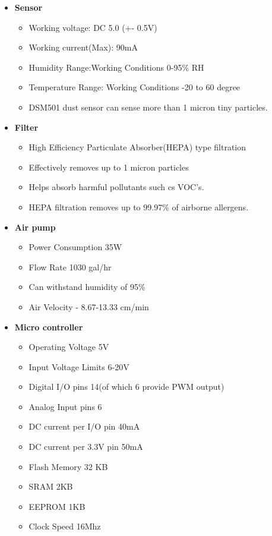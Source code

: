 \documentclass[12pt]{article}
\begin{document}
\begin{itemize}
\item \textbf{Sensor}
\begin{itemize}
\item Working voltage: DC 5.0 (+- 0.5V)
\item Working current(Max): 90mA 
\item Humidity Range:Working Conditions 0-95\% RH
\item Temperature Range: Working Conditions -20 to 60 degree
\item DSM501 dust sensor can sense more than 1 micron tiny particles.
\end{itemize}

\item \textbf{Filter}
\begin{itemize}
\item High Efficiency Particulate Absorber(HEPA) type filtration 
\item Effectively removes up to 1 micron particles
\item Helps absorb harmful pollutants such cs VOC's.
\item HEPA filtration removes up to 99.97\% of airborne 
allergens.
\end{itemize}

\newpage

\item \textbf{Air pump}

\begin{itemize}
\item Power Consumption 35W
\item Flow Rate 1030 gal/hr
\item Can withstand humidity of 95\%
\item Air Velocity - 8.67-13.33 cm/min
\end{itemize}

\item \textbf{Micro controller}
\begin{itemize}
\item Operating Voltage 5V
\item Input Voltage Limits 6-20V
\item Digital I/O pins 14(of which 6 provide PWM output)
\item Analog Input pins 6
\item DC current per I/O pin 40mA
\item DC current per 3.3V pin 50mA
\item Flash Memory 32 KB
\item SRAM 2KB
\item EEPROM 1KB
\item Clock Speed 16Mhz

\end{itemize}
\end{itemize}
\end{document}
